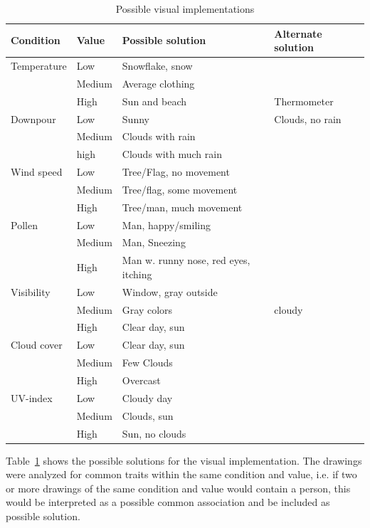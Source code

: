 \begin{table}[!htbp]
    \centering
    \begin{tabular}{l | l | l | l}
    Condition & Value & Possible solution & Alternate solution \\
    \hline \hline
    Temperature & Low & Snowflake, snow &  \\
    & Medium & Average clothing \\
    & High & Sun and beach & Thermometer \\
    \hline
    Downpour & Low & Sunny & Clouds, no rain \\
    & Medium & Clouds with rain & \\
    & high & Clouds with much rain & \\
    \hline
    Wind speed & Low & Tree/Flag, no movement & \\
    & Medium & Tree/flag, some movement & \\
    & High & Tree/man, much movement & \\
    \hline
    Pollen & Low & Man, happy/smiling & \\
    & Medium & Man, Sneezing & \\
    & High & Man w. runny nose, red eyes, itching & \\
    \hline
    Visibility & Low & Window, gray outside & \\
    & Medium & Gray colors & cloudy \\
    & High & Clear day, sun & \\
    \hline
    Cloud cover & Low & Clear day, sun & \\
    & Medium & Few Clouds & \\
    & High & Overcast & \\
    \hline
    UV-index & Low & Cloudy day & \\
    & Medium & Clouds, sun & \\
    & High & Sun, no clouds & \\
    \end{tabular}
    \caption{Possible visual implementations}
    \label{tab:visual_pre_test}
\end{table}

Table~\ref{tab:visual_pre_test} shows the possible solutions for the visual implementation.
The drawings were analyzed for common traits within the same condition and value, i.e. if two or more drawings of the same condition and value would contain a person, this would be interpreted as a possible common association and be included as possible solution.

